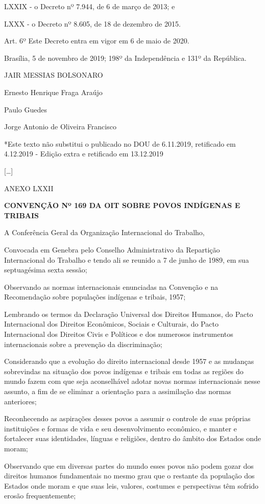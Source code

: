\documentclass[
]{book}
\begin{document}
LXXIX - o Decreto nº 7.944, de 6 de março de 2013; e

LXXX - o Decreto nº 8.605, de 18 de dezembro de 2015.

Art. 6º Este Decreto entra em vigor em 6 de maio de 2020.

Brasília, 5 de novembro de 2019; 198º da Independência e 131º da República.

JAIR MESSIAS BOLSONARO

Ernesto Henrique Fraga Araújo

Paulo Guedes

Jorge Antonio de Oliveira Francisco

*Este texto não substitui o publicado no DOU de 6.11.2019, retificado em 4.12.2019 - Edição extra e retificado em 13.12.2019

{[}\ldots{]}

ANEXO LXXII

\textbf{CONVENÇÃO Nº 169 DA OIT SOBRE POVOS INDÍGENAS E TRIBAIS}

A Conferência Geral da Organização Internacional do Trabalho,

Convocada em Genebra pelo Conselho Administrativo da Repartição Internacional do Trabalho e tendo ali se reunido a 7 de junho de 1989, em sua septuagésima sexta sessão;

Observando as normas internacionais enunciadas na Convenção e na Recomendação sobre populações indígenas e tribais, 1957;

Lembrando os termos da Declaração Universal dos Direitos Humanos, do Pacto Internacional dos Direitos Econômicos, Sociais e Culturais, do Pacto Internacional dos Direitos Civis e Políticos e dos numerosos instrumentos internacionais sobre a prevenção da discriminação;

Considerando que a evolução do direito internacional desde 1957 e as mudanças sobrevindas na situação dos povos indígenas e tribais em todas as regiões do mundo fazem com que seja aconselhável adotar novas normas internacionais nesse assunto, a fim de se eliminar a orientação para a assimilação das normas anteriores;

Reconhecendo as aspirações desses povos a assumir o controle de suas próprias instituições e formas de vida e seu desenvolvimento econômico, e manter e fortalecer suas identidades, línguas e religiões, dentro do âmbito dos Estados onde moram;

Observando que em diversas partes do mundo esses povos não podem gozar dos direitos humanos fundamentais no mesmo grau que o restante da população dos Estados onde moram e que suas leis, valores, costumes e perspectivas têm sofrido erosão frequentemente;
\end{document}

